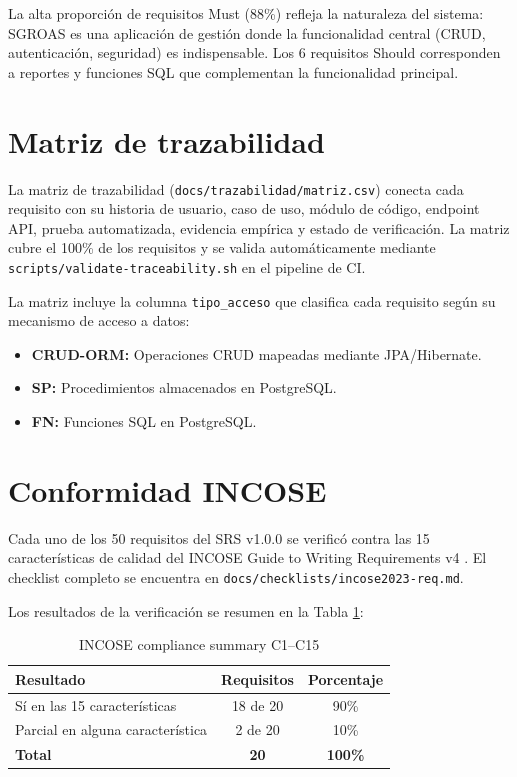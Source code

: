 La alta proporción de requisitos Must (88\%) refleja la naturaleza del sistema: SGROAS es una aplicación de gestión donde la funcionalidad central (CRUD, autenticación, seguridad) es indispensable. Los 6 requisitos Should corresponden a reportes y funciones SQL que complementan la funcionalidad principal.

\section{Matriz de trazabilidad}
\label{sec:traceability}

La matriz de trazabilidad (\texttt{docs/trazabilidad/matriz.csv}) conecta cada requisito con su historia de usuario, caso de uso, módulo de código, endpoint API, prueba automatizada, evidencia empírica y estado de verificación. La matriz cubre el 100\% de los requisitos y se valida automáticamente mediante \texttt{scripts/validate-traceability.sh} en el pipeline de CI.

La matriz incluye la columna \texttt{tipo\_acceso} que clasifica cada requisito según su mecanismo de acceso a datos:
\begin{itemize}
  \item \textbf{CRUD-ORM:} Operaciones CRUD mapeadas mediante JPA/Hibernate.
  \item \textbf{SP:} Procedimientos almacenados en PostgreSQL.
  \item \textbf{FN:} Funciones SQL en PostgreSQL.
\end{itemize}

\section{Conformidad INCOSE}
\label{sec:incose-compliance}

Cada uno de los 50 requisitos del SRS v1.0.0 se verificó contra las 15 características de calidad del INCOSE Guide to Writing Requirements v4 \cite{incose}. El checklist completo se encuentra en \texttt{docs/checklists/incose2023-req.md}.

Los resultados de la verificación se resumen en la Tabla \ref{tab:incose}:

\begin{table}[H]
\centering
\caption{INCOSE compliance summary C1--C15}
\label{tab:incose}
\begin{tabular}{lcc}
\toprule
\textbf{Resultado} & \textbf{Requisitos} & \textbf{Porcentaje} \\
\midrule
Sí en las 15 características & 18 de 20 & 90\% \\
Parcial en alguna característica & 2 de 20 & 10\% \\
\midrule
\textbf{Total} & \textbf{20} & \textbf{100\%} \\
\bottomrule
\end{tabular}
\end{table}

